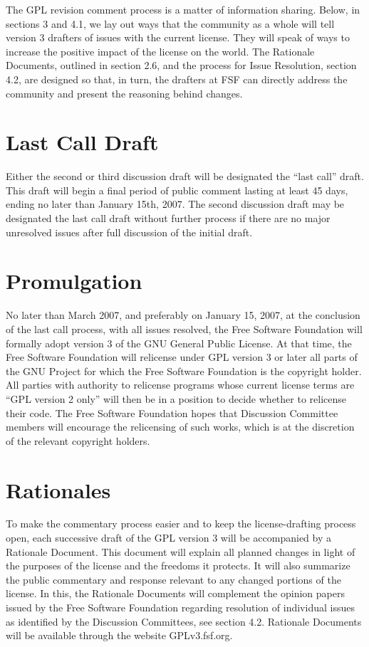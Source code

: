 The GPL revision comment process is a matter of information sharing.
Below, in sections 3 and 4.1, we lay out ways that the community as a
whole will tell version 3 drafters of issues with the current license.
They will speak of ways to increase the positive impact of the license on
the world.  The Rationale Documents, outlined in section 2.6, and the
process for Issue Resolution, section 4.2, are designed so that, in turn,
the drafters at FSF can directly address the community and present the
reasoning behind changes.

\section{Last Call Draft}

Either the second or third discussion draft will be designated the
``last call'' draft. This draft will begin a final period of public comment
lasting at least 45 days, ending no later than January 15th, 2007. The
second discussion draft may be designated the last call draft without
further process if there are no major unresolved issues after full
discussion of the initial draft.

\section{Promulgation}

No later than March 2007, and preferably on January 15, 2007, at the
conclusion of the last call process, with all issues resolved, the Free
Software Foundation will formally adopt version 3 of the GNU General Public
License. At that time, the Free Software Foundation will relicense under
GPL version 3 or later all parts of the GNU Project for which the Free
Software Foundation is the copyright holder. All parties with authority to
relicense programs whose current license terms are ``GPL version 2 only''
will then be in a position to decide whether to relicense their code. The
Free Software Foundation hopes that Discussion Committee members will
encourage the relicensing of such works, which is at the discretion of the
relevant copyright holders.

\section{Rationales}

To make the commentary process easier and to keep the license-drafting
process open, each successive draft of the GPL version 3 will be
accompanied by a Rationale Document. This document will explain all planned
changes in light of the purposes of the license and the freedoms it protects.
It will also summarize the public commentary and response relevant
to any changed portions of the license. In this, the Rationale Documents
will complement the opinion papers issued by the Free Software Foundation
regarding resolution of individual issues as identified by the Discussion
Committees, see section 4.2. Rationale Documents will be available
through the website GPLv3.fsf.org.

